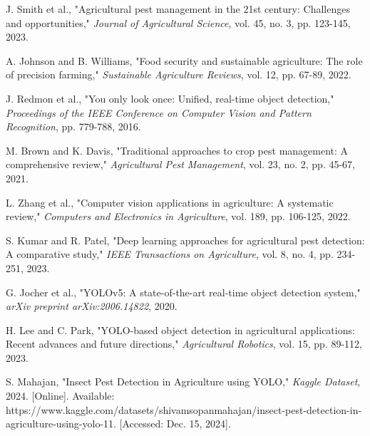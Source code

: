\thispagestyle{plain}

\begin{thebibliography}{00}

 J. Smith et al., "Agricultural pest management in the 21st century: Challenges and opportunities," \textit{Journal of Agricultural Science}, vol. 45, no. 3, pp. 123-145, 2023.

 A. Johnson and B. Williams, "Food security and sustainable agriculture: The role of precision farming," \textit{Sustainable Agriculture Reviews}, vol. 12, pp. 67-89, 2022.

 J. Redmon et al., "You only look once: Unified, real-time object detection," \textit{Proceedings of the IEEE Conference on Computer Vision and Pattern Recognition}, pp. 779-788, 2016.

 M. Brown and K. Davis, "Traditional approaches to crop pest management: A comprehensive review," \textit{Agricultural Pest Management}, vol. 23, no. 2, pp. 45-67, 2021.

 L. Zhang et al., "Computer vision applications in agriculture: A systematic review," \textit{Computers and Electronics in Agriculture}, vol. 189, pp. 106-125, 2022.

 S. Kumar and R. Patel, "Deep learning approaches for agricultural pest detection: A comparative study," \textit{IEEE Transactions on Agriculture}, vol. 8, no. 4, pp. 234-251, 2023.

 G. Jocher et al., "YOLOv5: A state-of-the-art real-time object detection system," \textit{arXiv preprint arXiv:2006.14822}, 2020.

 H. Lee and C. Park, "YOLO-based object detection in agricultural applications: Recent advances and future directions," \textit{Agricultural Robotics}, vol. 15, pp. 89-112, 2023.

 S. Mahajan, "Insect Pest Detection in Agriculture using YOLO," \textit{Kaggle Dataset}, 2024. [Online]. Available: https://www.kaggle.com/datasets/shivamsopanmahajan/insect-pest-detection-in-agriculture-using-yolo-11. [Accessed: Dec. 15, 2024].

\end{thebibliography}
